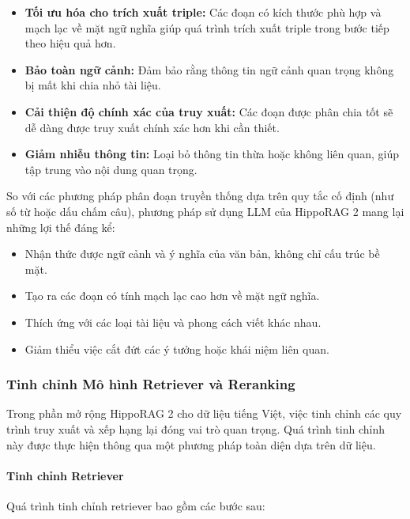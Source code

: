 \begin{itemize}
    \item \textbf{Tối ưu hóa cho trích xuất triple:} Các đoạn có kích thước phù hợp và mạch lạc về mặt ngữ nghĩa giúp quá trình trích xuất triple trong bước tiếp theo hiệu quả hơn.
    \item \textbf{Bảo toàn ngữ cảnh:} Đảm bảo rằng thông tin ngữ cảnh quan trọng không bị mất khi chia nhỏ tài liệu.
    \item \textbf{Cải thiện độ chính xác của truy xuất:} Các đoạn được phân chia tốt sẽ dễ dàng được truy xuất chính xác hơn khi cần thiết.
    \item \textbf{Giảm nhiễu thông tin:} Loại bỏ thông tin thừa hoặc không liên quan, giúp tập trung vào nội dung quan trọng.
\end{itemize}

So với các phương pháp phân đoạn truyền thống dựa trên quy tắc cố định (như số từ hoặc dấu chấm câu), phương pháp sử dụng LLM của HippoRAG 2 mang lại những lợi thế đáng kể:

\begin{itemize}
    \item Nhận thức được ngữ cảnh và ý nghĩa của văn bản, không chỉ cấu trúc bề mặt.
    \item Tạo ra các đoạn có tính mạch lạc cao hơn về mặt ngữ nghĩa.
    \item Thích ứng với các loại tài liệu và phong cách viết khác nhau.
    \item Giảm thiểu việc cắt đứt các ý tưởng hoặc khái niệm liên quan.
\end{itemize}

\subsubsection{Tinh chỉnh Mô hình Retriever và Reranking}
Trong phần mở rộng HippoRAG 2 cho dữ liệu tiếng Việt, việc tinh chỉnh các quy trình truy xuất và xếp hạng lại đóng vai trò quan trọng. Quá trình tinh chỉnh này được thực hiện thông qua một phương pháp toàn diện dựa trên dữ liệu.

\paragraph{Tinh chỉnh Retriever}
Quá trình tinh chỉnh retriever bao gồm các bước sau:

